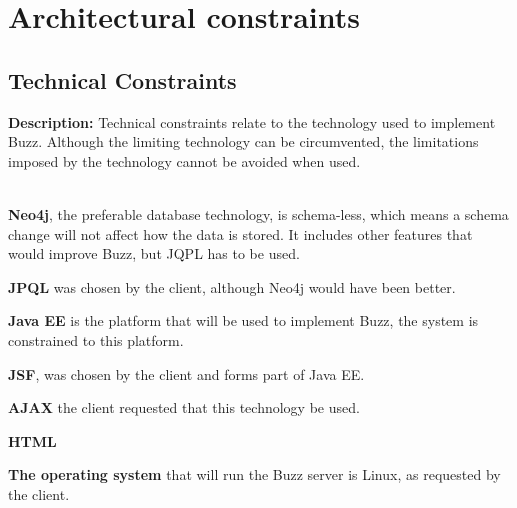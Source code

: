 \documentclass{article}
\begin{document}
\section{Architectural constraints}
\subsection{Technical Constraints}
\textbf{Description:}
Technical constraints relate to the technology used to implement Buzz. Although the limiting technology can be circumvented, the limitations imposed by the technology cannot be avoided when used. \\ \\ \par
\textbf{Neo4j}, the preferable database technology, is schema-less, which means a schema change will not affect how the data is stored. It includes other features that would improve Buzz, but JQPL has to be used. \\ \par
\textbf{JPQL} was chosen by the client, although Neo4j would have been better. \\ \par
\textbf{Java EE} is the platform that will be used to implement Buzz, the system is constrained to this platform. \\ \par
\textbf{JSF}, was chosen by the client and forms part of Java EE. \\ \par
\textbf{AJAX} the client requested that this technology be used.  \\ \par
\textbf{HTML} \\ \par 
\textbf{The operating system} that will run the Buzz server is Linux, as requested by the client.
\end{document}
